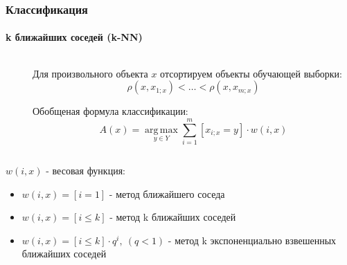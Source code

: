 \documentclass[xcolor=table]{beamer}
\begin{document}
\begin{frame}
  \frametitle{Классификация}
  \framesubtitle{k ближайших соседей (k-NN)}

  \begin{columns}
    \begin{column}{0.4\textwidth}
    \end{column}
    \begin{column}{0.6\textwidth}
      Для произвольного объекта $x$ отсортируем объекты обучающей выборки:
      \[\rho(x, x_{1;x}) < \dots < \rho(x, x_{m;x})\]

      Обобщеная формула классификации:
      \vspace{-10pt}
      \[A(x) = \operatorname*{arg\,max}_{y \in Y}{\sum_{i=1}^m[x_{i;x} = y] \cdot w(i, x)}\]
    \end{column}
  \end{columns}  

  $w(i, x)$ - весовая функция:
  \begin{itemize}
  \item $w(i, x) = [i = 1]$ - метод ближайшего соседа
  \item $w(i, x) = [i \leq k]$ - метод k ближайших соседей
  \item $w(i, x) = [i \leq k] \cdot q^i,~(q < 1)$ - метод k экспоненциально взвешенных ближайших соседей
  \end{itemize}
\end{frame}
\end{document}
